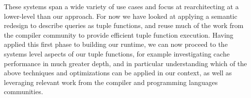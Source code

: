 These systems span a wide variety of use cases and focus at rearchitecting at a
lower-level than our approach. For now we have looked at applying a semantic
redesign to describe queries as tuple functions, and reuse much of the work from
the compiler community to provide efficient tuple function execution. Having
applied this first phase to building our runtime, we can now proceed to the
systems level aspects of our tuple functions, for example investigating cache
performance in much greater depth, and in particular understanding which of the
above techniques and optimizations can be applied in our context, as well as
leveraging relevant work from the compiler and programming languages
communities.

